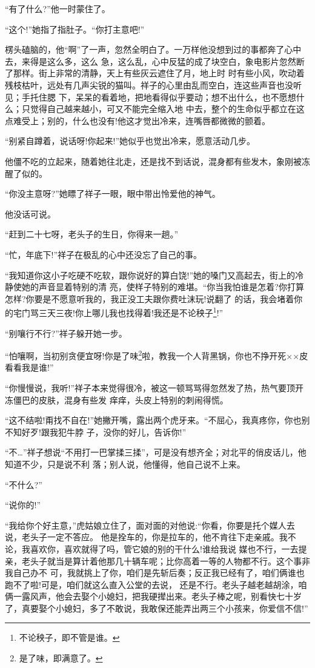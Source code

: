 \documentclass[11pt,a4paper,onecolumn]{article}
\begin{document}
``有了什么?''他一时蒙住了。

``这个!''她指了指肚子。``你打主意吧!''

楞头磕脑的，他``啊''了一声，忽然全明白了。一万样他没想到过的事都奔了心中去，来得是这么多，这么
急，这么乱，心中反猛的成了块空白，象电影片忽然断了那样。街上非常的清静，天上有些灰云遮住了月，地上时
时有些小风，吹动着残枝枯叶，远处有几声尖锐的猫叫。祥子的心里由乱而空白，连这些声音也没听见；手托住腮
下，呆呆的看着地，把地看得似乎要动；想不出什么，也不愿想什么；只觉得自己越来越小，可又不能完全缩入地
中去，整个的生命似乎都立在这点难受上；别的，什么也没有!他这才觉出冷来，连嘴唇都微微的颤着。

``别紧自蹲着，说话呀!你起来!''她似乎也觉出冷来，愿意活动几步。

他僵不吃的立起来，随着她往北走，还是找不到话说，混身都有些发木，象刚被冻醒了似的。

``你没主意呀?''她瞟了祥子一眼，眼中带出怜爱他的神气。

他没话可说。

``赶到二十七呀，老头子的生日，你得来一趟。''

``忙，年底下!''祥子在极乱的心中还没忘了自己的事。

``我知道你这小子吃硬不吃软，跟你说好的算白饶!''她的嗓门又高起去，街上的冷静使她的声音显着特别的清
亮，使样子特别的难堪。``你当我怕谁是怎着?你打算怎样?你要是不愿意听我的，我正没工夫跟你费吐沫玩!说翻了
的话，我会堵着你的宅门骂三天三夜!你上哪儿我也找得着!我还是不论秧子\footnote{不论秧子，即不管是谁。}!''

``别嚷行不行?''祥子躲开她一步。

``怕嚷啊，当初别贪便宜呀!你是了味\footnote{是了味，即满意了。}啦，教我一个人背黑锅，你也不挣开死××皮
看看我是谁!''

``你慢慢说，我听!''祥子本来觉得很冷，被这一顿骂骂得忽然发了热，热气要顶开冻僵巴的皮肤，混身有些发
痒痒，头皮上特别的刺闹得慌。

``这不结啦!甭找不自在!''她撇开嘴，露出两个虎牙来。``不屈心，我真疼你，你也别不知好歹!跟我犯牛脖
子，没你的好儿，告诉你!''

``不\ldots ''祥子想说``不用打一巴掌揉三揉''，可是没有想齐全；对北平的俏皮话儿，他知道不少，只是说不利
落；别人说，他懂得，他自己说不上来。

``不什么?''

``说你的!''

``我给你个好主意，''虎姑娘立住了，面对面的对他说:``你看，你要是托个媒人去说，老头子一定不答应。
他是拴车的，你是拉车的，他不肯往下走亲戚。我不论，我喜欢你，喜欢就得了吗，管它娘的别的干什么!谁给我说
媒也不行，一去提亲，老头子就当是算计着他那几十辆车呢；比你高着一等的人物都不行。这个事非我自己办不
可，我就挑上了你，咱们是先斩后奏；反正我已经有了，咱们俩谁也跑不了啦!可是，咱们就这么直入公堂的去说，
还是不行。老头子越老越胡涂，咱俩一露风声，他会去娶个小媳妇，把我硬撵出来。老头子棒之呢，别看快七十岁
了，真要娶个小媳妇，多了不敢说，我敢保还能弄出两三个小孩来，你爱信不信!''
\end{document}
